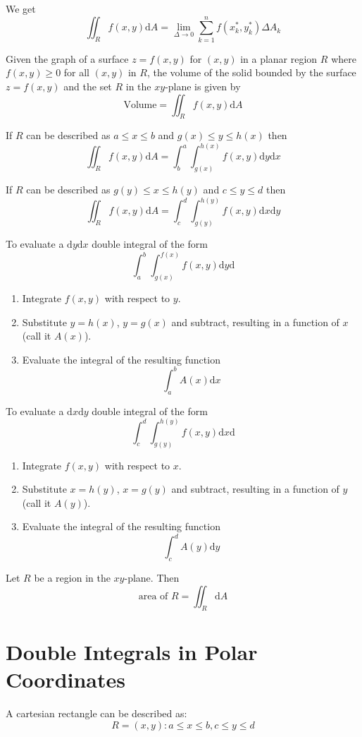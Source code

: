 \documentclass[../calc3.tex]{subfiles}
\begin{document}
We get 
\[\iint_R f(x,y)\mathrm{d}A = \lim_{\Delta \to 0}\sum_{k=1}^n f(x_k^*, y_k^*)\Delta A_k\]

Given the graph of a surface $z=f(x,y)$ for $(x,y)$ in a planar region $R$ where $f(x,y)\geq 0$ for all $(x,y)$
in $R$, the volume of the solid bounded by the surface $z=f(x,y)$ and the set $R$ in the $xy$-plane is given by 
\[\text{Volume} = \iint_R f(x,y)\mathrm{d}A\]

If $R$ can be described as $a\leq x \leq b$ and $g(x)\leq y \leq h(x)$ then 
\[\iint_R f(x,y)\mathrm{d}A = \int^a_b\int_{g(x)}^{h(x)}f(x,y)\mathrm{d}y\mathrm{d}x\]

If $R$ can be described as $g(y)\leq x \leq h(y)$ and $c\leq y \leq d$ then
\[\iint_R f(x,y)\mathrm{d}A= \int_c^d\int_{g(y)}^{h(y)}f(x,y)\mathrm{d}x\mathrm{d}y\]

To evaluate a $\mathrm{d}y\mathrm{d}x$ double integral of the form 
\[\int_a^b\int_{g(x)}^{f(x)} f(x,y)\mathrm{d}y\mathrm{d}\]
\begin{enumerate}
    \item Integrate $f(x,y)$ with respect to $y$.
    \item Substitute $y=h(x)$, $y=g(x)$ and subtract, resulting in a function of $x$ (call it $A(x)$).
    \item Evaluate the integral of the resulting function 
    \[\int_a^b A(x)\mathrm{d}x\]
\end{enumerate}

To evaluate a $\mathrm{d}x \mathrm{d}y$ double integral of the form 
\[\int_c^d \int_{g(y)}^{h(y)} f(x,y)\mathrm{d}x\mathrm{d}\]
\begin{enumerate}
    \item Integrate $f(x,y)$ with respect to $x$.
    \item Substitute $x=h(y)$, $x=g(y)$ and subtract, resulting in a function of $y$ (call it $A(y)$).
    \item Evaluate the integral of the resulting function 
    \[\int_c^d A(y)\mathrm{d}y\]
\end{enumerate}

\begin{definition} 
    Let $R$ be a region in the $xy$-plane. Then 
    \[\text{area of }R = \iint_R \mathrm{d}A\]
\end{definition}

\section{Double Integrals in Polar Coordinates}
A cartesian rectangle can be described as:
\[R={(x,y) : a\leq x\leq b, c\leq y\leq d}\]
\end{document}
